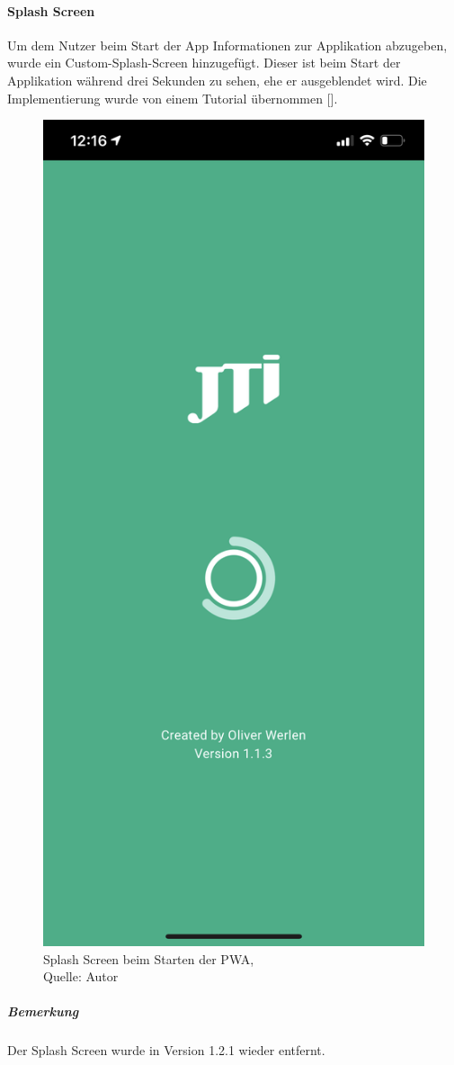\paragraph{Splash Screen}
Um dem Nutzer beim Start der App Informationen zur Applikation abzugeben, wurde ein Custom-Splash-Screen hinzugefügt. Dieser ist beim Start der Applikation während drei Sekunden zu sehen, ehe er ausgeblendet wird. 
Die Implementierung wurde von einem Tutorial übernommen [\cite{splash}].
\begin{figure}[H]
	\centering
	\includegraphics[scale=0.1]{images/splashScreen.jpeg}
	\caption[Splash Screen beim Starten der PWA]{Splash Screen beim Starten der PWA,\\ Quelle: Autor}
	\label{img: splashScreen}
\end{figure} 
\subparagraph{Bemerkung}
Der Splash Screen wurde in Version 1.2.1 wieder entfernt. 

